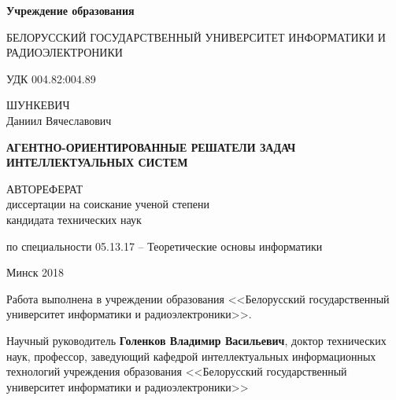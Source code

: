 \documentclass{thesisby}
\begin{document}
\thispagestyle{empty}

\begin{center} 

\bfseries
{Учреждение образования}
\medskip

{БЕЛОРУССКИЙ ГОСУДАРСТВЕННЫЙ УНИВЕРСИТЕТ ИНФОРМАТИКИ И РАДИОЭЛЕКТРОНИКИ}


\vspace{2cm}
\end{center}

\noindent УДК 004.82:004.89 \\[5mm]

\begin{center}

{ШУНКЕВИЧ \\ Даниил Вячеславович}\\

\vspace{1cm}

{\bfseries АГЕНТНО-ОРИЕНТИРОВАННЫЕ РЕШАТЕЛИ ЗАДАЧ  ИНТЕЛЛЕКТУАЛЬНЫХ СИСТЕМ}\\ \vspace{2cm}

АВТОРЕФЕРАТ\\ диссертации на соискание ученой степени\\
кандидата технических наук\\
\medskip



    
\vspace{1cm}
по специальности 05.13.17 -- Теоретические основы информатики 

\vspace*{\fill}


Минск 2018
\end{center}


\newpage

\thispagestyle{empty} 

\noindent Работа выполнена в учреждении образования <<Белорусский государственный университет информатики и радиоэлектроники>>.

\vspace*{\fill} 

 

\noindent \hangindent=70mm 
     Научный руководитель \hspace{10mm} {\bf Голенков Владимир Васильевич}, доктор технических наук, профессор, заведующий кафедрой  интеллектуальных информационных технологий учреждения образования <<Белорусский государственный университет информатики и радиоэлектроники>>\\
            
\end{document}
